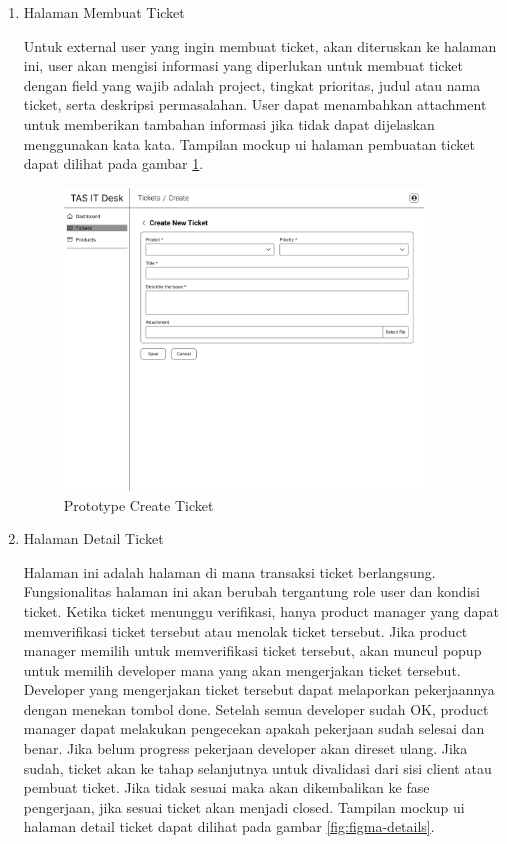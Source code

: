 \documentclass[12pt]{article}
\begin{document}
\begin{enumerate}[label=\textbf{4.\arabic*.}]
\begin{enumerate} [label=\textbf{4.3.\arabic*.}, wide, labelwidth=!, labelindent=0pt]
\begin{enumerate}[label=\arabic*.]
            \item Halaman Membuat Ticket
        
            Untuk external user yang ingin membuat ticket, akan diteruskan ke halaman ini, user akan mengisi informasi yang diperlukan untuk membuat ticket dengan field yang wajib adalah project, tingkat prioritas, judul atau nama ticket, serta deskripsi permasalahan. User dapat menambahkan attachment untuk memberikan tambahan informasi jika tidak dapat dijelaskan menggunakan kata kata. Tampilan mockup ui halaman pembuatan ticket dapat dilihat pada gambar \ref{fig:figma-create}.

            \begin{figure}[H]
                \centering \includegraphics[width=0.9\textwidth]{images/figma/[Client] Ticket Create.png}
                \caption{Prototype Create Ticket}
                \label{fig:figma-create}
            \end{figure}
        

            \item Halaman Detail Ticket

            Halaman ini adalah halaman di mana transaksi ticket berlangsung. Fungsionalitas halaman ini akan berubah tergantung role user dan kondisi ticket. Ketika ticket menunggu verifikasi, hanya product manager yang dapat memverifikasi ticket tersebut atau menolak ticket tersebut. Jika product manager memilih untuk memverifikasi ticket tersebut, akan muncul popup untuk memilih developer mana yang akan mengerjakan ticket tersebut. Developer yang mengerjakan ticket tersebut dapat melaporkan pekerjaannya dengan menekan tombol done. Setelah semua developer sudah OK, product manager dapat melakukan pengecekan apakah pekerjaan sudah selesai dan benar. Jika belum progress pekerjaan developer akan direset ulang. Jika sudah, ticket akan ke tahap selanjutnya untuk divalidasi dari sisi client atau pembuat ticket. Jika tidak sesuai maka akan dikembalikan ke fase pengerjaan, jika sesuai ticket akan menjadi closed. Tampilan mockup ui halaman detail ticket dapat dilihat pada gambar \ref{fig:figma-details}.


\end{enumerate}
\end{enumerate}
\end{enumerate}
\end{document}
